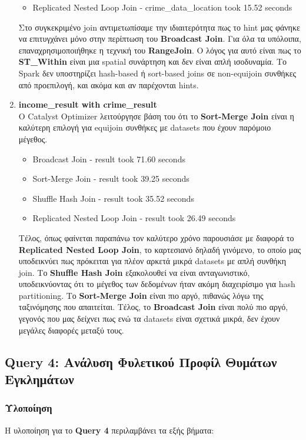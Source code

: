 \documentclass{article}
\begin{document}
\begin{enumerate}
\begin{itemize}
		\item Replicated Nested Loop Join - crime\_data\_location took 15.52 seconds
	\end{itemize}
Στο συγκεκριμένο join αντιμετωπίσαμε την ιδιαιτερότητα πως το hint μας φάνηκε να επιτυγχάνει μόνο στην περίπτωση του \textbf{Broadcast Join}. Για όλα τα υπόλοιπα, επαναχρησιμοποιήθηκε η τεχνική του \textbf{RangeJoin}.  Ο λόγος για αυτό είναι πως το \textbf{ST\_Within} είναι μια spatial συνάρτηση και δεν είναι απλή ισοδυναμία. Το Spark δεν υποστηρίζει hash-based ή sort-based joins σε non-equijoin συνθήκες από προεπιλογή, και ακόμα και αν παρέχονται hints.
\item \textbf{income\_result with crime\_result} \\
Ο Catalyst Optimizer λειτούργησε βάση του ότι το \textbf{Sort-Merge Join} είναι η καλύτερη επιλογή για equijoin συνθήκες με datasets που έχουν παρόμοιο μέγεθος. 
	\begin{itemize}
		\item Broadcast Join - result took 71.60 seconds
		\item Sort-Merge Join - result took 39.25 seconds
		\item Shuffle Hash Join - result took 35.52 seconds
		\item Replicated Nested Loop Join - result took 26.49 seconds
	\end{itemize}
Τέλος, όπως φαίνεται παραπάνω τον καλύτερο χρόνο παρουσιάσε με διαφορά το \textbf{Replicated Nested Loop Join}, το καρτεσιανό δηλαδή γινόμενο, το οποίο μας υποδεικνύει πως πρόκειται για πλέον αρκετά μικρά datasets με απλή συνθήκη join. Το \textbf{Shuffle Hash Join} εξακολουθεί να είναι ανταγωνιστικό, υποδεικνύοντας ότι το μέγεθος των δεδομένων ήταν ακόμη διαχειρίσιμο για hash partitioning. Το \textbf{Sort-Merge Join} είναι πιο αργό, πιθανώς λόγω της ταξινόμησης που απαιτείται. Τέλος, το \textbf{Broadcast Join} είναι πολύ πιο αργό, γεγονός που μας δείχνει πως ενώ τα datasets είναι σχετικά μικρά, δεν έχουν μεγάλες διαφορές μεταξύ τους. 
\end{enumerate}

\newpage
\subsection{Query 4: Ανάλυση Φυλετικού Προφίλ Θυμάτων Εγκλημάτων}
\subsubsection*{ Υλοποίηση}
Η υλοποίηση για το \textbf{Query 4} περιλαμβάνει τα εξής βήματα:
\end{document}
